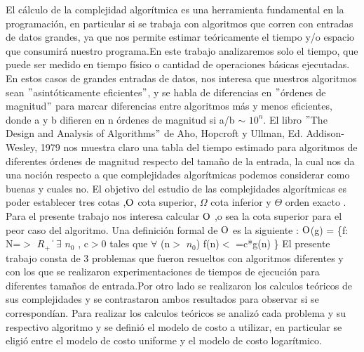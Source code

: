 El cálculo de la complejidad algorítmica es una herramienta fundamental en la programación, en particular si se trabaja con algoritmos que corren con entradas de datos grandes, ya que nos permite estimar teóricamente el tiempo y/o espacio que consumirá nuestro programa.En este trabajo analizaremos solo el tiempo, que puede ser medido en tiempo físico o cantidad de operaciones básicas ejecutadas.
\newline
En estos casos de grandes entradas de datos, nos interesa que nuestros algoritmos sean $"$asintóticamente eficientes$"$, y se habla de diferencias en $"$órdenes de magnitud$"$ para marcar diferencias entre algoritmos más y menos eficientes, donde a y b difieren en n órdenes de magnitud si a/b $\sim$ $10^{n}$.
\newline
El libro $"$The Design and Analysis of Algorithms$"$ de Aho, Hopcroft y Ullman, Ed. Addison-Wesley, 1979 nos muestra claro una tabla del tiempo estimado para algoritmos de diferentes órdenes de magnitud respecto del tamaño de la entrada, la cual nos da una noción respecto a que complejidades algorítmicas podemos considerar como buenas y cuales no. 
\newline
El objetivo del estudio de las complejidades algorítmicas es poder establecer tres cotas ,$\rm O$ cota superior, $\Omega$ cota inferior y  $\Theta$ orden exacto .
\newline
Para el presente trabajo nos interesa calcular $\rm O$ ,o sea la cota superior para el peor caso del algoritmo.
\newline
Una definición formal de $\rm O$ es la siguiente :
\newline
$\rm O$(g) = \{f: N=$>$ $R_+$ \| $\exists$ $n_0$ , c$>$0 tales que $\forall$ (n$>$ $n_0$) f(n)$<$ =c*g(n) \}
\newline
El presente trabajo consta de 3 problemas que fueron resueltos con algoritmos diferentes y con los que se realizaron experimentaciones de tiempos de ejecución para diferentes tamaños de entrada.Por otro lado se realizaron los calculos teóricos de sus complejidades y se contrastaron ambos resultados para observar si se correspondían.
\newline
Para realizar los calculos teóricos se analizó cada problema y su respectivo algoritmo y se definió el modelo de costo a utilizar, en particular se eligió entre el modelo de costo uniforme y el modelo de costo logarítmico.
 
